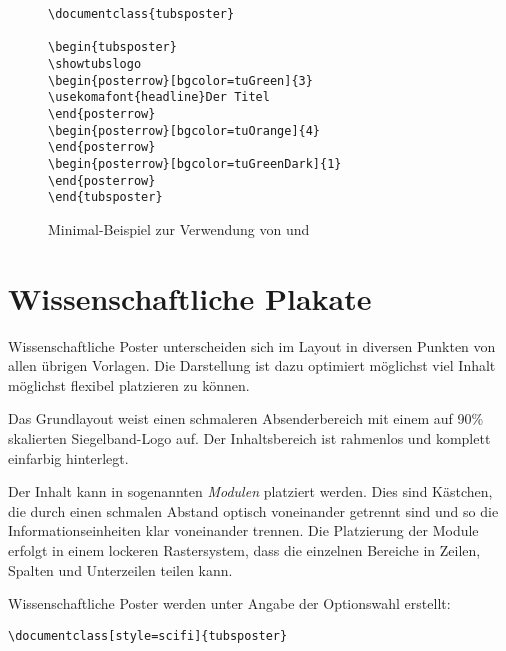 \begin{figure}[!ht]
\begin{minipage}{0.65\textwidth}
\begin{lstlisting}
\documentclass{tubsposter}

\begin{tubsposter}
\showtubslogo
\begin{posterrow}[bgcolor=tuGreen]{3}
\usekomafont{headline}Der Titel
\end{posterrow}
\begin{posterrow}[bgcolor=tuOrange]{4}
\end{posterrow}
\begin{posterrow}[bgcolor=tuGreenDark]{1}
\end{posterrow}
\end{tubsposter}

\end{lstlisting}
\end{minipage}
\begin{minipage}{0.35\textwidth}
\end{minipage}
\caption{Minimal-Beispiel zur Verwendung von  und
  }
\end{figure}


\clearpage
\section{Wissenschaftliche Plakate}

Wissenschaftliche Poster unterscheiden sich im Layout in diversen Punkten
von allen übrigen Vorlagen. Die Darstellung ist dazu optimiert möglichst
viel Inhalt möglichst flexibel platzieren zu können.

Das Grundlayout weist einen schmaleren Absenderbereich mit einem auf 90\%
skalierten Siegelband-Logo auf.
Der Inhaltsbereich ist rahmenlos und komplett einfarbig hinterlegt.

Der Inhalt kann in sogenannten \emph{Modulen} platziert werden.
Dies sind Kästchen, die durch einen schmalen Abstand optisch
voneinander getrennt sind und so die Informationseinheiten klar voneinander
trennen.
Die Platzierung der Module erfolgt in einem lockeren Rastersystem,
dass die einzelnen Bereiche in Zeilen, Spalten und Unterzeilen teilen kann.

Wissenschaftliche Poster werden unter Angabe der Optionswahl
 erstellt:
\begin{lstlisting}
\documentclass[style=scifi]{tubsposter}
\end{lstlisting}

